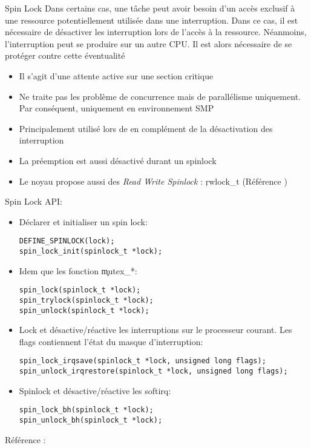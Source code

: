 \begin{frame}[fragile=singleslide]{Spin Lock}
  Dans certains cas, une tâche peut avoir besoin d'un accès exclusif à
  une ressource  potentiellement utilisée dans  une interruption. Dans
  ce cas,  il est  nécessaire de désactiver  les interruption  lors de
  l'accès à la ressource.   Néanmoins, l'interruption peut se produire
  sur un  autre CPU.   Il est alors  nécessaire de se  protéger contre
  cette éventualité
  \begin{itemize} 
  \item Il s'agit d'une attente active sur une section critique
  \item Ne traite pas les  problème de concurrence mais de parallélisme
    uniquement. Par conséquent, uniquement en environnement SMP
  \item   Principalement  utilisé   lors  de   en  complément   de  la
    désactivation des interruption
  \item La préemption est aussi désactivé durant un spinlock
  \item  Le  noyau propose  aussi  des  \emph{Read  Write Spinlock}  :
    \c{rwlock_t} (Référence )
  \end{itemize}  
\end{frame}

\begin{frame}[fragile=singleslide]{Spin Lock}
  API:
  \begin{itemize}
  \item Déclarer et initialiser un spin lock:
    \begin{lstlisting} 
DEFINE_SPINLOCK(lock);
spin_lock_init(spinlock_t *lock);
    \end{lstlisting} 
  \item Idem que les fonction \c{mutex_*}:
    \begin{lstlisting} 
spin_lock(spinlock_t *lock);
spin_trylock(spinlock_t *lock);
spin_unlock(spinlock_t *lock);
    \end{lstlisting} 
  \item Lock et désactive/réactive les interruptions sur le processeur
    courant.  Les flags contiennent l'état du masque d'interruption:
    \begin{lstlisting} 
spin_lock_irqsave(spinlock_t *lock, unsigned long flags);
spin_unlock_irqrestore(spinlock_t *lock, unsigned long flags);
    \end{lstlisting} 
  \item Spinlock et désactive/réactive les softirq:
    \begin{lstlisting} 
spin_lock_bh(spinlock_t *lock);
spin_unlock_bh(spinlock_t *lock);
    \end{lstlisting} 
  \end{itemize}
  Référence :  
\end{frame}


